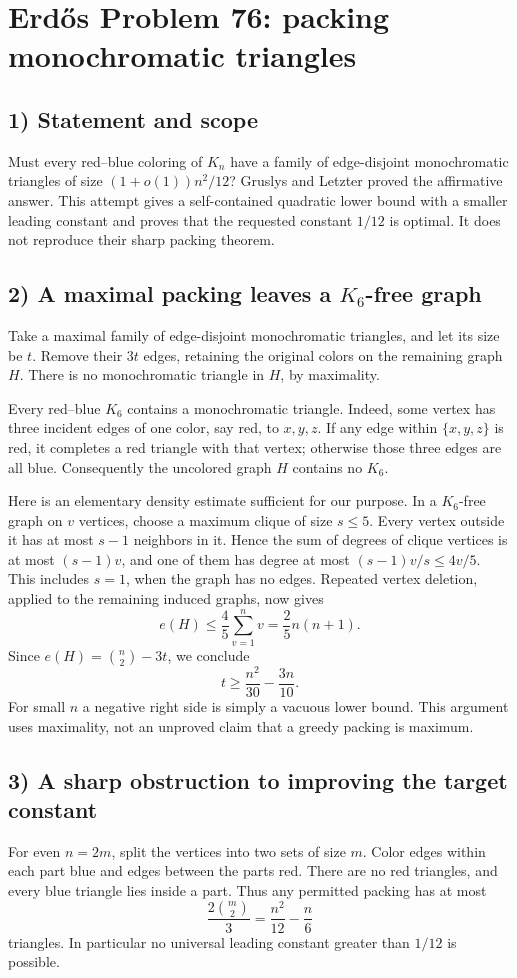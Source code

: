 \section{Erd\H{o}s Problem 76: packing monochromatic triangles}

\subsection{1) Statement and scope}
Must every red--blue coloring of $K_n$ have a family of edge-disjoint
monochromatic triangles of size $(1+o(1))n^2/12$?
Gruslys and Letzter proved the affirmative answer. This attempt gives
a self-contained quadratic lower bound with a smaller leading
constant and proves that the requested constant $1/12$ is optimal.
It does not reproduce their sharp packing theorem.

\subsection{2) A maximal packing leaves a $K_6$-free graph}
Take a maximal family of edge-disjoint monochromatic triangles,
and let its size be $t$. Remove their $3t$ edges, retaining the
original colors on the remaining graph $H$. There is no monochromatic
triangle in $H$, by maximality.

Every red--blue $K_6$ contains a monochromatic triangle. Indeed,
some vertex has three incident edges of one color, say red, to
$x,y,z$. If any edge within $\{x,y,z\}$ is red, it completes a red
triangle with that vertex; otherwise those three edges are all blue.
Consequently the uncolored graph $H$ contains no $K_6$.

Here is an elementary density estimate sufficient for our purpose.
In a $K_6$-free graph on $v$ vertices, choose a maximum clique of
size $s\leq5$. Every vertex outside it has at most $s-1$ neighbors
in it. Hence the sum of degrees of clique vertices is at most
$(s-1)v$, and one of them has degree at most
$(s-1)v/s\leq4v/5$. This includes $s=1$, when the graph has no
edges. Repeated vertex deletion, applied to the remaining induced
graphs, now gives
\[
 e(H)\leq\frac45\sum_{v=1}^n v=\frac25 n(n+1).
\]
Since $e(H)=\binom n2-3t$, we conclude
\[
 t\geq\frac{n^2}{30}-\frac{3n}{10}.
\]
For small $n$ a negative right side is simply a vacuous lower bound.
This argument uses maximality, not an unproved claim that a greedy
packing is maximum.

\subsection{3) A sharp obstruction to improving the target constant}
For even $n=2m$, split the vertices into two sets of size $m$.
Color edges within each part blue and edges between the parts red.
There are no red triangles, and every blue triangle lies inside a
part. Thus any permitted packing has at most
\[
 \frac{2\binom m2}{3}
 =\frac{n^2}{12}-\frac n6
\]
triangles. In particular no universal leading constant greater than
$1/12$ is possible.

